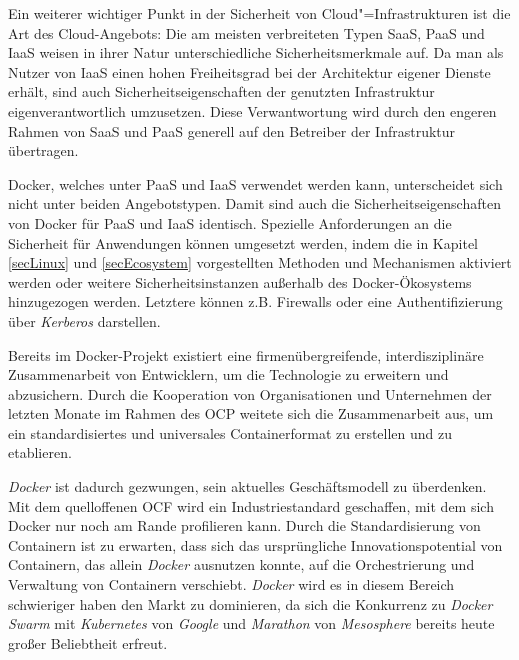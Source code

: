 \documentclass[../main.tex]{subfiles}
\begin{document}
  Ein weiterer wichtiger Punkt in der Sicherheit von Cloud"=Infrastrukturen ist die Art des Cloud-Angebots: Die am meisten verbreiteten Typen SaaS, PaaS und IaaS weisen in ihrer Natur unterschiedliche Sicherheitsmerkmale auf. Da man als Nutzer von IaaS einen hohen Freiheitsgrad bei der Architektur eigener Dienste erhält, sind auch Sicherheitseigenschaften der genutzten Infrastruktur eigenverantwortlich umzusetzen. Diese Verwantwortung wird durch den engeren Rahmen von SaaS und PaaS generell auf den Betreiber der Infrastruktur übertragen.

  Docker, welches unter PaaS und IaaS verwendet werden kann, unterscheidet sich nicht unter beiden Angebotstypen. Damit sind auch die Sicherheitseigenschaften von Docker für PaaS und IaaS identisch. Spezielle Anforderungen an die Sicherheit für Anwendungen können umgesetzt werden, indem die in Kapitel \ref{secLinux} und \ref{secEcosystem} vorgestellten Methoden und Mechanismen aktiviert werden oder weitere Sicherheitsinstanzen außerhalb des Docker-Ökosystems hinzugezogen werden. Letztere können z.B. Firewalls oder eine Authentifizierung über \emph{Kerberos} darstellen.





  Bereits im Docker-Projekt existiert eine firmenübergreifende, interdisziplinäre Zusammenarbeit von Entwicklern, um die Technologie zu erweitern und abzusichern. Durch die Kooperation von Organisationen und Unternehmen der letzten Monate im Rahmen des \acrshort{OCP} weitete sich die Zusammenarbeit aus, um ein standardisiertes und universales Containerformat zu erstellen und zu etablieren.

  \emph{Docker} ist dadurch gezwungen, sein aktuelles Geschäftsmodell zu überdenken. Mit dem quelloffenen OCF wird ein Industriestandard geschaffen, mit dem sich Docker nur noch am Rande profilieren kann. Durch die Standardisierung von Containern ist zu erwarten, dass sich das ursprüngliche Innovationspotential von Containern, das allein \emph{Docker} ausnutzen konnte, auf die Orchestrierung und Verwaltung von Containern verschiebt. \emph{Docker} wird es in diesem Bereich schwieriger haben den Markt zu dominieren, da sich die Konkurrenz zu \emph{Docker Swarm} mit \emph{Kubernetes} von \emph{Google} und \emph{Marathon} von \emph{Mesosphere} bereits heute großer Beliebtheit erfreut.
\end{document}
